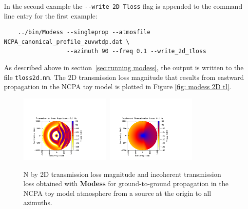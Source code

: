 In the second example the \verb+--write_2D_Tloss+ flag is appended to the command line entry for the first example: 
\begin{verbatim} 
    ../bin/Modess --singleprop --atmosfile NCPA_canonical_profile_zuvwtdp.dat \ 
                  --azimuth 90 --freq 0.1 --write_2d_tloss
\end{verbatim}
As described above in section~\ref{sec:running modess}, the output is written to the file \verb+tloss2d.nm+. The 2D transmission loss magnitude that results from eastward propagation in the NCPA toy model is plotted in Figure \ref{fig: modess 2D tl}. 
\begin{figure}
\begin{center}
\includegraphics[width=0.4\textwidth]{figs/modess_ex3}\ 
\includegraphics[width=0.4\textwidth]{figs/modess_ex3_inco}
\end{center}
\caption{N by 2D transmission loss magnitude and incoherent transmission loss obtained with {\bf Modess} for ground-to-ground propagation in the NCPA toy model atmosphere from a source at the origin to all azimuths.}
\label{fig: modess Nby2D tl}
\end{figure}

